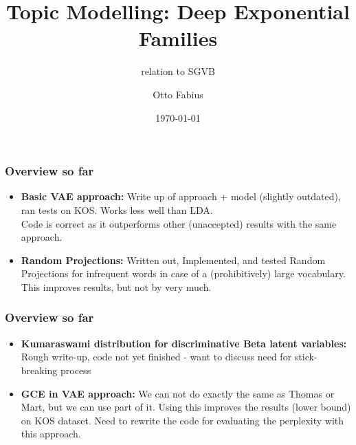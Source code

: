 \documentclass{beamer}
\title[Overview]{Topic Modelling: Deep Exponential Families}
\subtitle{relation to SGVB}
\author{Otto Fabius}
\institute[UvA] 
{University of Amsterdam \\
Supervisor: P.Putzky \\ 
Co-Supervisors: M. Welling, D.P. Kingma
\medskip
}
\date{\today} %
\begin{document}



\begin{frame}
\frametitle{Overview so far}
\begin{itemize}
\item{\textbf{Basic VAE approach:} Write up of approach + model (slightly outdated), ran tests on KOS. Works less well than LDA. \\
Code is correct as it outperforms other (unaccepted) results with the same approach.}
\item{\textbf{Random Projections:} Written out, Implemented, and tested Random Projections for infrequent words in case of a (prohibitively) large vocabulary. \\
This improves results, but not by very much. }
\end{itemize}
\end{frame}

\begin{frame}
\frametitle{Overview so far}
\begin{itemize}
\item{\textbf{Kumaraswami distribution for discriminative Beta latent variables:} Rough write-up, code not yet finished - want to discuss need for stick-breaking process}
\item{\textbf{GCE in VAE approach:} We can not do exactly the same as Thomas or Mart, but we can use part of it. Using this improves the results (lower bound) on KOS dataset. Need to rewrite the code for evaluating the perplexity with this approach.}
\end{itemize}
\end{frame}
\end{document}
